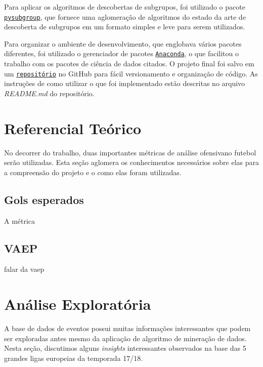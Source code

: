 \documentclass{article}
\begin{document}
Para aplicar os algoritmos de descobertas de subgrupos, foi utilizado o pacote
\href{https://pysubgroup.readthedocs.io/en/latest/}{\texttt{pysubgroup}}, que
fornece uma aglomeração de algoritmos do estado da arte de descoberta de
subgrupos em um formato simples e leve para serem utilizados.


Para organizar o ambiente de desenvolvimento, que englobava vários pacotes
diferentes, foi utilizado o gerenciador de pacotes
\href{https://www.anaconda.com/}{\texttt{Anaconda}}, o que facilitou o trabalho
com os pacotes de ciência de dados citados. O projeto final foi salvo em um
\href{https://github.com/lframosferreira/projeto-ad}{\texttt{repositório}}
no GitHub para fácil versionamento e organização de código. As instruções de
como
utilizar o que foi implementado estão descritas no arquivo \textit{README.md}
do repositório.

\section{Referencial Teórico}

No decorrer do trabalho, duas importantes métricas de análise ofensivano futebol serão utilizadas. Esta seção 
aglomera os conhecimentos necessários sobre elas para a compreensão do projeto e o como elas foram utilizadas.

\subsection{Gols esperados}

A métrica

\subsection{VAEP}

falar da vaep \cite{vaep}

\section{Análise Exploratória}

A base de dados de eventos possui muitas informações interessantes que podem
ser exploradas antes mesmo da aplicação
de algoritmo de mineração de dados. Nesta seção, discutimos alguns
\textit{insights} interessantes observados na base das 5 grandes ligas
europeias da temporada 17/18.
\end{document}
